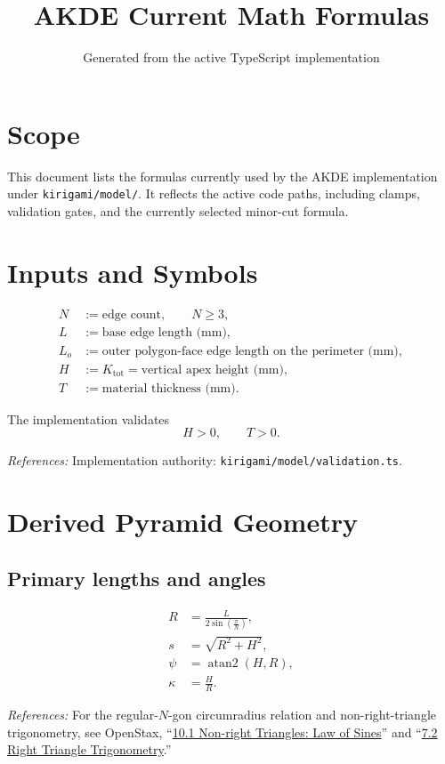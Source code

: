 \documentclass[11pt]{article}
\title{AKDE Current Math Formulas}
\author{}
\date{Generated from the active TypeScript implementation}
\newcommand{\formularefs}[1]{%
\par\smallskip
\noindent\footnotesize\textit{References: }#1
\par\smallskip\normalsize
}
\begin{document}
\maketitle

\section{Scope}

This document lists the formulas currently used by the AKDE implementation under
\texttt{kirigami/model/}. It reflects the active code paths, including clamps,
validation gates, and the currently selected minor-cut formula.

\section{Inputs and Symbols}

\begin{align*}
N &:= \text{edge count}, \qquad N \ge 3, \\
L &:= \text{base edge length (mm)}, \\
L_o &:= \text{outer polygon-face edge length on the perimeter (mm)}, \\
H &:= K_{\mathrm{tot}} = \text{vertical apex height (mm)}, \\
T &:= \text{material thickness (mm)}.
\end{align*}

The implementation validates
\[
H > 0,
\qquad
T > 0.
\]

\formularefs{Implementation authority: \texttt{kirigami/model/validation.ts}.}

\section{Derived Pyramid Geometry}

\subsection{Primary lengths and angles}

\begin{align}
R &= \frac{L}{2\sin\!\left(\frac{\pi}{N}\right)}, \\
s &= \sqrt{R^2 + H^2}, \\
\psi &= \operatorname{atan2}(H,R), \\
\kappa &= \frac{H}{R}.
\end{align}

\formularefs{For the regular-\(N\)-gon circumradius relation and non-right-triangle trigonometry, see OpenStax, ``\href{https://openstax.org/books/algebra-and-trigonometry-2e/pages/10-1-non-right-triangles-law-of-sines}{10.1 Non-right Triangles: Law of Sines}'' and ``\href{https://openstax.org/books/algebra-and-trigonometry-2e/pages/7-2-right-triangle-trigonometry}{7.2 Right Triangle Trigonometry}.''}
\end{document}
